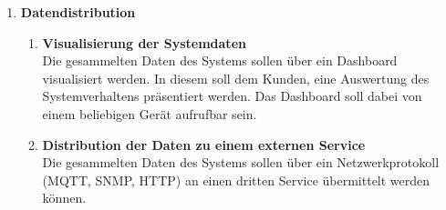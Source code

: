 \begin{enumerate}
    \item \textbf{Datendistribution}
    \begin{enumerate}
        \item \textbf{Visualisierung der Systemdaten}\\
        Die gesammelten Daten des Systems sollen über ein Dashboard visualisiert werden. In diesem soll dem Kunden, eine Auswertung des Systemverhaltens präsentiert werden. Das Dashboard soll dabei von einem beliebigen Gerät aufrufbar sein.
        \item \textbf{Distribution der Daten zu einem externen Service}\\
        Die gesammelten Daten des Systems sollen über ein Netzwerkprotokoll (MQTT, SNMP, HTTP) an einen dritten Service übermittelt werden können.
    \end{enumerate}

   \end{enumerate}

